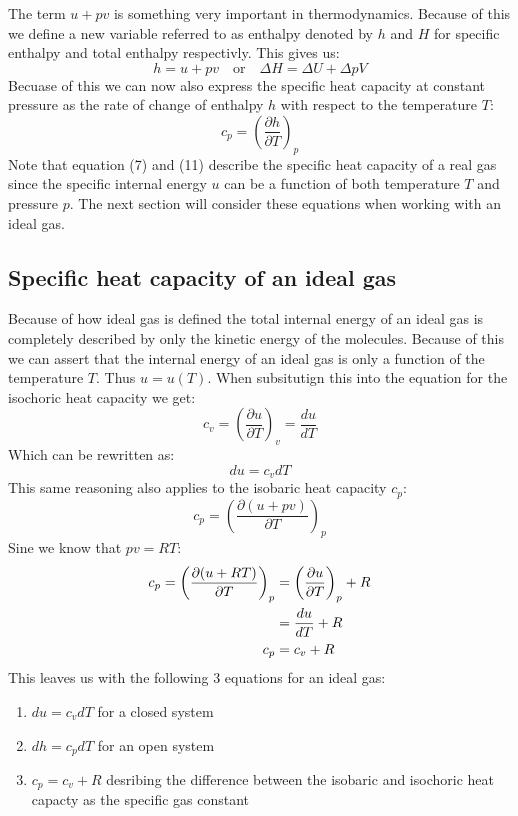 \documentclass[11pt, a4paper]{article}
\begin{document}
The term $u+pv$ is something very important in thermodynamics. Because of this we define a new variable referred to as enthalpy denoted by $h$ and $H$ for specific enthalpy and total enthalpy respectivly. This gives us:
\begin{equation}
  h = u + pv \quad \text{or} \quad \Delta H = \Delta U + \Delta pV
\end{equation}
Becuase of this we can now also express the specific heat capacity at constant pressure as the rate of change of enthalpy $h$ with respect to the temperature $T$:
\begin{equation}
  c_p = \left( \frac{\partial h}{\partial T} \right)_p
\end{equation}
Note that equation (7) and (11) describe the specific heat capacity of a real gas since the specific internal energy $u$ can be a function of both temperature $T$ and pressure $p$. The next section will consider these equations when working with an ideal gas.


\subsection{Specific heat capacity of an ideal gas}
Because of how ideal gas is defined the total internal energy of an ideal gas is completely described by only the kinetic energy of the molecules. Because of this we can assert that the internal energy of an ideal gas is only a function of the temperature $T$. Thus $u = u(T)$. When subsitutign this into the equation for the isochoric heat capacity we get:
\begin{equation}
  c_v = \left( \frac{\partial u}{\partial T} \right)_v = \frac{du}{dT}
\end{equation}
Which can be rewritten as:
\begin{equation}
  du = c_v dT
\end{equation}
This same reasoning also applies to the isobaric heat capacity $c_p$:
\begin{equation}
  c_p = \left( \frac{\partial(u + pv)}{\partial T} \right)_p
\end{equation}
Sine we know that $pv=RT$:
\begin{align}
  c_p =\left(\frac{\partial(u+RT)}{\partial T}\right)_p &=\left(\frac{\partial u}{\partial T}\right)_p+R\notag \\
                                                        &= \frac{du}{dT} + R \notag \\
                                                   c_p  &= c_v + R
\end{align}
This leaves us with the following 3 equations for an ideal gas:
\begin{enumerate}
  \item $du = c_v dT$ for a closed system
  \item $dh = c_p dT$ for an open system
  \item $c_p = c_v + R$ desribing the difference between the isobaric and isochoric heat capacty as the specific gas constant
\end{enumerate}
\end{document}
